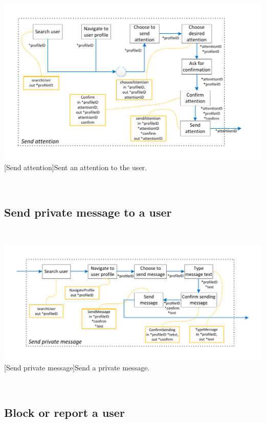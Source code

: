 \documentclass[11pt, a4paper,svglistings,oneside]{book}
\begin{document}
$\;$ \\
\noindent\begin{minipage}{\textwidth}
    \centering
   \includegraphics[scale=1]{nav_SendAttention.pdf}
 [Send attention]{Sent an attention to the user.}
\end{minipage}
$\;$ \\ 

\subsection{Send private message to a user}

$\;$ \\
\noindent\begin{minipage}{\textwidth}
    \centering
   \includegraphics[scale=1]{nav_SendPrivateMessage.pdf}
 [Send private message]{Send a private message.}
\end{minipage}
$\;$ \\ 

\subsection{Block or report a user}
\end{document}
